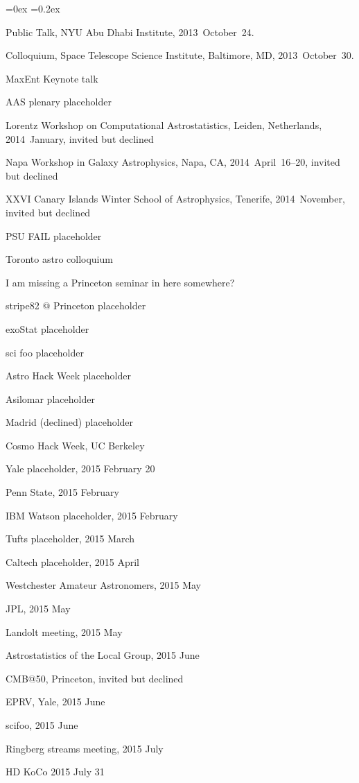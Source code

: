 \documentclass[12pt,letterpaper]{article}
\newcounter{refpubnum}
\newcommand{\hogglist}{%
    \rightmargin=0in
    \leftmargin=0.18in
    \topsep=0ex
    \partopsep=0pt
    \itemsep=0.2ex
    \parsep=0pt
    \itemindent=-1.0\leftmargin
    \listparindent=0.0\leftmargin
    \settowidth{\labelsep}{~}
    \usecounter{refpubnum}
  }
\begin{document}
\begin{list}{}{\hogglist}
{\item Public Talk, NYU Abu Dhabi Institute, 2013~October~24.
\item Colloquium, Space Telescope Science Institute, Baltimore, MD, 2013~October~30.
\item MaxEnt Keynote talk
\item AAS plenary placeholder
\item Lorentz Workshop on Computational Astrostatistics, Leiden, Netherlands, 2014~January, invited but declined
\item Napa Workshop in Galaxy Astrophysics, Napa, CA, 2014~April~16--20, invited but declined
\item XXVI Canary Islands Winter School of Astrophysics, Tenerife, 2014~November, invited but declined
\item PSU FAIL placeholder
\item Toronto astro colloquium
\item [I am missing a Princeton seminar in here somewhere?]
\item stripe82 @ Princeton placeholder
\item exoStat placeholder
\item sci foo placeholder
\item Astro Hack Week placeholder
\item Asilomar placeholder
\item Madrid (declined) placeholder
\item Cosmo Hack Week, UC Berkeley
\item Yale placeholder, 2015 February 20
\item Penn State, 2015 February
\item IBM Watson placeholder, 2015 February
\item Tufts placeholder, 2015 March
\item Caltech placeholder, 2015 April
\item Westchester Amateur Astronomers, 2015 May
\item JPL, 2015 May
\item Landolt meeting, 2015 May
\item Astrostatistics of the Local Group, 2015 June
\item CMB@50, Princeton, invited but declined
\item EPRV, Yale, 2015 June
\item scifoo, 2015 June
\item Ringberg streams meeting, 2015 July
\item HD KoCo 2015 July 31
}
\end{list}
\end{document}
